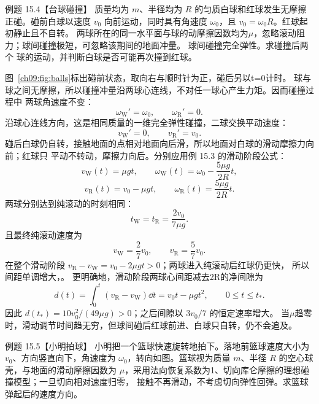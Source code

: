 \Needspace{0.35\textheight}
\begin{origexamplebox}{例题 15.4【台球碰撞】}
质量均为 $m$、半径均为 $R$ 的匀质白球和红球发生无摩擦正碰。碰前白球以速度 $v_0$
向前运动，同时具有角速度 $\omega_0$，且 $v_0=\omega_0R$。红球起初静止且不自转。
两球所在的同一水平面与球的动摩擦因数均为$\mu$，忽略滚动阻力；球间碰撞极短，可忽略该期间的地面冲量。
球间碰撞完全弹性。求碰撞后两个
球的运动，并判断白球是否可能再次撞到红球。
\ballsCollisionDiagram
\end{origexamplebox}

\begin{xesolution}
图~\ref{ch09:fig:balls}标出碰前状态，取向右与顺时针为正，碰后另以t=0计时。
球与球之间无摩擦，所以碰撞冲量沿两球心连线，不对任一球心产生力矩。因而碰撞过程中
两球角速度不变：
\[
 \omega_{\mathrm W}'=\omega_0,
 \qquad \omega_{\mathrm R}'=0.
\]
沿球心连线方向，这是相同质量的一维完全弹性碰撞，二球交换平动速度：
\[
 v_{\mathrm W}'=0,
 \qquad v_{\mathrm R}'=v_0.
\]
碰后白球仍自转，接触地面的点相对地面向后滑，所以地面对白球的滑动摩擦力向前；红球只
平动不转动，摩擦力向后。分别应用例 15.3 的滑动阶段公式：
\[
 v_{\mathrm W}(t)=\mu gt,
 \qquad
 \omega_{\mathrm W}(t)=\omega_0-\frac{5\mu g}{2R}t,
\]
\[
 v_{\mathrm R}(t)=v_0-\mu gt,
 \qquad
 \omega_{\mathrm R}(t)=\frac{5\mu g}{2R}t.
\]
两球分别达到纯滚动的时刻相同：
\[
 t_{\mathrm W}=t_{\mathrm R}=\frac{2v_0}{7\mu g}.
\]
且最终纯滚动速度为
\[
 \boxed{v_{\mathrm W}=\frac27v_0},
 \qquad
 \boxed{v_{\mathrm R}=\frac57v_0}.
\]
在整个滑动阶段 $v_{\mathrm R}-v_{\mathrm W}=v_0-2\mu gt>0$；两球进入纯滚动后红球仍更快，
所以间距单调增大，。
更明确地，滑动阶段两球心间距减去2R的净间隙为
\[
 d(t)=\int_0^t(v_{\mathrm R}-v_{\mathrm W})\dd t
 =v_0t-\mu gt^2,\qquad 0\le t\le t_*.
\]
因此 $d(t_*)=10v_0^2/(49\mu g)>0$；之后间隙以 $3v_0/7$ 的恒定速率增大。
当$\mu$趋零时，滑动调节时间趋无穷，但球间碰后红球前进、白球只自转，仍不会追及。
\end{xesolution}

\Needspace{0.37\textheight}
\begin{origexamplebox}{例题 15.5【小明拍球】}
小明把一个篮球快速旋转地拍下。落地前篮球速度大小为 $v_0$、方向竖直向下，角速度为
$\omega_0$，转向如图。篮球视为质量 $m$、半径 $R$ 的空心球壳，与地面的滑动摩擦因数为
$\mu$，采用法向恢复系数为1、切向库仑摩擦的理想碰撞模型；一旦切向相对速度归零，
接触不再滑动，不考虑切向弹性回弹。求篮球弹起后的速度方向。
\bounceSpinProblemDiagram
\end{origexamplebox}

